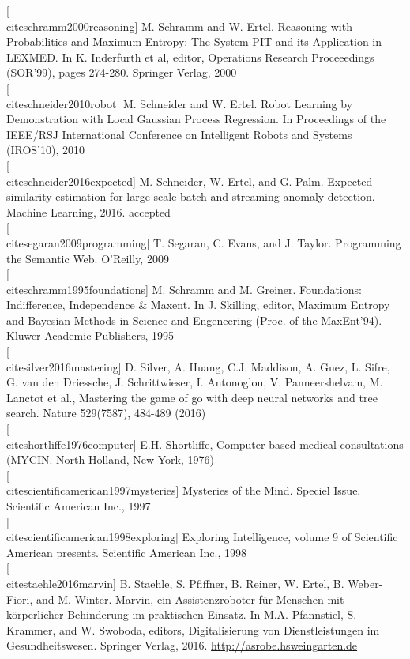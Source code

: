 \documentclass[10pt]{book}
\begin{document}
[\\cite{schramm2000reasoning}] M. Schramm and W. Ertel. Reasoning with Probabilities and Maximum Entropy: The System PIT and its Application in LEXMED. In K. Inderfurth et al, editor, Operations Research Proceeedings (SOR'99), pages 274-280. Springer Verlag, 2000\\[0pt]
[\\cite{schneider2010robot}] M. Schneider and W. Ertel. Robot Learning by Demonstration with Local Gaussian Process Regression. In Proceedings of the IEEE/RSJ International Conference on Intelligent Robots and Systems (IROS'10), 2010\\[0pt]
[\\cite{schneider2016expected}] M. Schneider, W. Ertel, and G. Palm. Expected similarity estimation for large-scale batch and streaming anomaly detection. Machine Learning, 2016. accepted\\[0pt]
[\\cite{segaran2009programming}] T. Segaran, C. Evans, and J. Taylor. Programming the Semantic Web. O'Reilly, 2009\\[0pt]
[\\cite{schramm1995foundations}] M. Schramm and M. Greiner. Foundations: Indifference, Independence \& Maxent. In J. Skilling, editor, Maximum Entropy and Bayesian Methods in Science and Engeneering (Proc. of the MaxEnt'94). Kluwer Academic Publishers, 1995\\[0pt]
[\\cite{silver2016mastering}] D. Silver, A. Huang, C.J. Maddison, A. Guez, L. Sifre, G. van den Driessche, J. Schrittwieser, I. Antonoglou, V. Panneershelvam, M. Lanctot et al., Mastering the game of go with deep neural networks and tree search. Nature 529(7587), 484-489 (2016)\\[0pt]
[\\cite{shortliffe1976computer}] E.H. Shortliffe, Computer-based medical consultations (MYCIN. North-Holland, New York, 1976)\\[0pt]
[\\cite{scientificamerican1997mysteries}] Mysteries of the Mind. Speciel Issue. Scientific American Inc., 1997\\[0pt]
[\\cite{scientificamerican1998exploring}] Exploring Intelligence, volume 9 of Scientific American presents. Scientific American Inc., 1998\\[0pt]
[\\cite{staehle2016marvin}] B. Staehle, S. Pfiffner, B. Reiner, W. Ertel, B. Weber-Fiori, and M. Winter. Marvin, ein Assistenzroboter für Menschen mit körperlicher Behinderung im praktischen Einsatz. In M.A. Pfannstiel, S. Krammer, and W. Swoboda, editors, Digitalisierung von Dienstleistungen im Gesundheitswesen. Springer Verlag, 2016. \href{http://asrobe.hsweingarten.de}{http://asrobe.hsweingarten.de}\\
\end{document}
